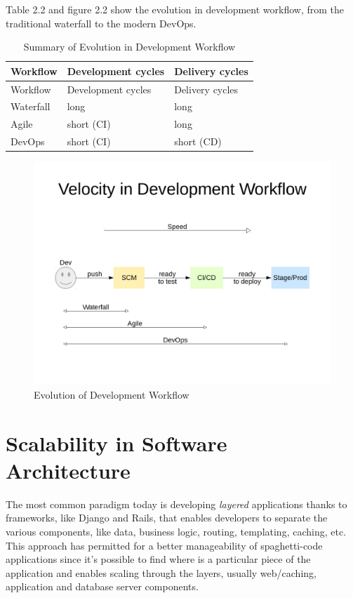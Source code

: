 Table 2.2 and figure 2.2 show the evolution in development workflow, from the traditional waterfall to the modern DevOps.

\begin{longtable}[c]{@{}lll@{}}
\caption{Summary of Evolution in Development Workflow}\tabularnewline
\toprule
Workflow & Development cycles & Delivery cycles\tabularnewline
\midrule
\endfirsthead
\toprule
Workflow & Development cycles & Delivery cycles\tabularnewline
\midrule
\endhead
Waterfall & long & long\tabularnewline
Agile & short (CI) & long\tabularnewline
DevOps & short (CI) & short (CD)\tabularnewline
\bottomrule
\end{longtable}

\begin{figure}[htbp]
\centering
\includegraphics{media/ch2-devops.png}
\caption{Evolution of Development Workflow}
\end{figure}

\section{Scalability in Software
Architecture}\label{scalability-in-software-architecture}

The most common paradigm today is developing \textit{layered} applications
thanks to frameworks, like Django and Rails, that enables developers to
separate the various components, like data, business logic, routing,
templating, caching, etc. This approach has permitted for a better
manageability of spaghetti-code applications since it's possible to find
where is a particular piece of the application and enables scaling
through the layers, usually web/caching, application and database server
components.

